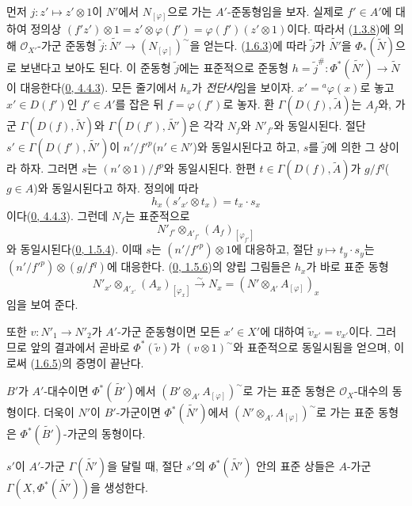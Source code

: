먼저 $j:z'\mapsto z'\otimes1$이 $N'$에서 $N_{[\varphi]}$으로 가는
$A'$-준동형임을 보자. 실제로 $f'\in A'$에 대하여 정의상
$(f'z')\otimes1=z'\otimes\varphi(f')=\varphi(f')(z'\otimes1)$이다.
따라서 (\hyperref[I.1.3.8-ko]{1.3.8})에 의해
$\mathscr{O}_{X'}$-가군 준동형
$\widetilde{j}:\widetilde{N'}\to(N_{[\varphi]})^{\sim}$을 얻는다.
(\hyperref[I.1.6.3-ko]{1.6.3})에 따라 $\widetilde{j}$가
$\widetilde{N'}$을 $\Phi_*(\widetilde{N})$으로 보낸다고 보아도 된다.
이 준동형 $\widetilde{j}$에는 표준적으로 준동형
$h=\widetilde{j}^{\#}:\Phi^*(\widetilde{N'})\to\widetilde{N}$이
대응한다(\hyperref[0.4.4.3-ko]{0, 4.4.3}). 모든 줄기에서 $h_x$가
\emph{전단사}임을 보이자. $x'={}^a\varphi(x)$로 놓고
$x'\in D(f')$인 $f'\in A'$를 잡은 뒤 $f=\varphi(f')$로 놓자. 환
$\Gamma(D(f),\widetilde{A})$는 $A_f$와, 가군
$\Gamma(D(f),\widetilde{N})$와
$\Gamma(D(f'),\widetilde{N'})$은 각각 $N_f$와 $N'_{f'}$와
동일시된다. 절단 $s'\in\Gamma(D(f'),\widetilde{N'})$이
$n'/{f'}^p$($n'\in N'$)와 동일시된다고 하고, $s$를
$\widetilde{j}$에 의한 그 상이라 하자. 그러면 $s$는
$(n'\otimes1)/f^p$와 동일시된다. 한편
$t\in\Gamma(D(f),\widetilde{A})$가 $g/f^q$($g\in A$)와
동일시된다고 하자. 정의에 따라
\[
  h_x(s'_{x'}\otimes t_x)=t_x\cdot s_x
\]
이다(\hyperref[0.4.4.3-ko]{0, 4.4.3}). 그런데
$N_f$는 표준적으로
\[
  N'_{f'}\otimes_{A'_{f'}}(A_f)_{[\varphi_{f'}]}
\]
와 동일시된다(\hyperref[0.1.5.4-ko]{0, 1.5.4}). 이때 $s$는
$(n'/{f'}^p)\otimes1$에 대응하고, 절단 $y\mapsto t_y\cdot s_y$는
$(n'/{f'}^p)\otimes(g/f^q)$에 대응한다.
(\hyperref[0.1.5.6-ko]{0, 1.5.6})의 양립 그림들은 $h_x$가 바로
표준 동형
\[
  \label{I.1.6.5.1-ko}
  N'_{x'}\otimes_{A'_{x'}}(A_x)_{[\varphi_x]}
  \xrightarrow{\sim}N_x=(N'\otimes_{A'}A_{[\varphi]})_x
  \tag{1.6.5.1}
\]
임을 보여 준다.

또한 $v:N'_1\to N'_2$가 $A'$-가군 준동형이면 모든 $x'\in X'$에
대하여 $\widetilde{v}_{x'}=v_{x'}$이다. 그러므로 앞의 결과에서 곧바로
$\Phi^*(\widetilde{v})$가 $(v\otimes1)^{\sim}$와 표준적으로
동일시됨을 얻으며, 이로써
(\hyperref[I.1.6.5-ko]{1.6.5})의 증명이 끝난다.

$B'$가 $A'$-대수이면 $\Phi^*(\widetilde{B'})$에서
$(B'\otimes_{A'}A_{[\varphi]})^{\sim}$로 가는 표준 동형은
$\mathscr{O}_X$-대수의 동형이다. 더욱이 $N'$이 $B'$-가군이면
$\Phi^*(\widetilde{N'})$에서
$(N'\otimes_{A'}A_{[\varphi]})^{\sim}$로 가는 표준 동형은
$\Phi^*(\widetilde{B'})$-가군의 동형이다.

\begin{corollary}[1.6.6]
\label{I.1.6.6-ko}
$s'$이 $A'$-가군 $\Gamma(\widetilde{N'})$을 달릴 때, 절단 $s'$의
$\Phi^*(\widetilde{N'})$ 안의 표준 상들은 $A$-가군
$\Gamma(X,\Phi^*(\widetilde{N'}))$을 생성한다.
\end{corollary}

